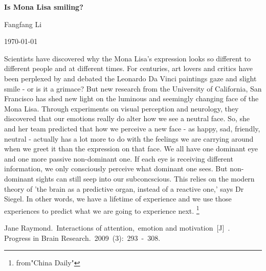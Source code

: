\documentclass{article}
\begin{document}
\begin{center}
{\bfseries \LARGE Is Mona Lisa smiling? }
\end{center}
\begin{center}
Fangfang Li
\end{center}
\begin{center}
\today
\end{center}
\par Scientists have discovered why the Mona Lisa's expression looks so different to different people and at different times. For centuries, art lovers and critics have been perplexed by and debated the Leonardo Da Vinci paintings gaze and slight smile - or is it a grimace? But new research from the University of California, San Francisco has shed new light on the luminous and seemingly changing face of the Mona Lisa. Through experiments on visual perception and neurology, they discovered that our emotions really do alter how we see a neutral face. So, she and her team predicted that how we perceive a new face - as happy, sad, friendly, neutral - actually has a lot more to do with the feelings we are carrying around when we greet it than the expression on that face. We all have one dominant eye and one more passive non-dominant one. If each eye is receiving different information, we only consciously perceive what dominant one sees. But non-dominant sights can still seep into our subconcscious. This relies on the modern theory of 'the brain as a predictive organ, instead of a reactive one,' says Dr Siegel. In other words, we have a lifetime of experience and we use those experiences to predict what we are going to experience next. 
\footnote{from"China Daily"}
\begin{thebibliography}{99}
Jane Raymond.~Interactions of attention,~emotion and motivation~[J]~.~ Progress in Brain Research.~2009~(3):~293~-~308.
\end{thebibliography}
\end{document}
